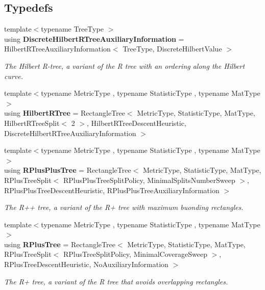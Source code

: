 \subsection*{Typedefs}
\begin{DoxyCompactItemize}
\item 
{\footnotesize template$<$typename Tree\+Type $>$ }\\using \textbf{ Discrete\+Hilbert\+R\+Tree\+Auxiliary\+Information} = Hilbert\+R\+Tree\+Auxiliary\+Information$<$ Tree\+Type, Discrete\+Hilbert\+Value $>$
\begin{DoxyCompactList}\small\item\em The Hilbert R-\/tree, a variant of the R tree with an ordering along the Hilbert curve. \end{DoxyCompactList}\item 
{\footnotesize template$<$typename Metric\+Type , typename Statistic\+Type , typename Mat\+Type $>$ }\\using \textbf{ Hilbert\+R\+Tree} = Rectangle\+Tree$<$ Metric\+Type, Statistic\+Type, Mat\+Type, Hilbert\+R\+Tree\+Split$<$ 2 $>$, Hilbert\+R\+Tree\+Descent\+Heuristic, Discrete\+Hilbert\+R\+Tree\+Auxiliary\+Information $>$
\item 
{\footnotesize template$<$typename Metric\+Type , typename Statistic\+Type , typename Mat\+Type $>$ }\\using \textbf{ R\+Plus\+Plus\+Tree} = Rectangle\+Tree$<$ Metric\+Type, Statistic\+Type, Mat\+Type, R\+Plus\+Tree\+Split$<$ R\+Plus\+Plus\+Tree\+Split\+Policy, Minimal\+Splits\+Number\+Sweep $>$, R\+Plus\+Plus\+Tree\+Descent\+Heuristic, R\+Plus\+Plus\+Tree\+Auxiliary\+Information $>$
\begin{DoxyCompactList}\small\item\em The R++ tree, a variant of the R+ tree with maximum buonding rectangles. \end{DoxyCompactList}\item 
{\footnotesize template$<$typename Metric\+Type , typename Statistic\+Type , typename Mat\+Type $>$ }\\using \textbf{ R\+Plus\+Tree} = Rectangle\+Tree$<$ Metric\+Type, Statistic\+Type, Mat\+Type, R\+Plus\+Tree\+Split$<$ R\+Plus\+Tree\+Split\+Policy, Minimal\+Coverage\+Sweep $>$, R\+Plus\+Tree\+Descent\+Heuristic, No\+Auxiliary\+Information $>$
\begin{DoxyCompactList}\small\item\em The R+ tree, a variant of the R tree that avoids overlapping rectangles. \end{DoxyCompactList}\item 

\end{DoxyCompactItemize}
